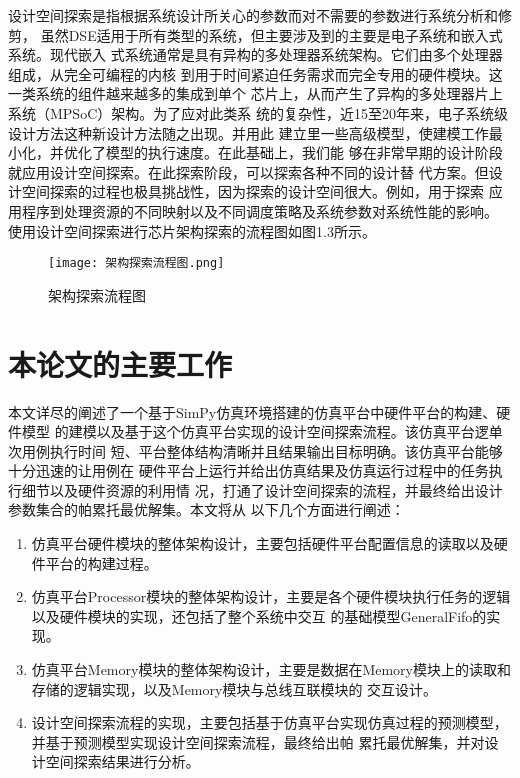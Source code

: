 设计空间探索是指根据系统设计所关心的参数而对不需要的参数进行系统分析和修剪\cite{13}，
虽然DSE适用于所有类型的系统，但主要涉及到的主要是电子系统和嵌入式系统。现代嵌入
式系统通常是具有异构的多处理器系统架构。它们由多个处理器组成，从完全可编程的内核
到用于时间紧迫任务需求而完全专用的硬件模块。这一类系统的组件越来越多的集成到单个
芯片上，从而产生了异构的多处理器片上系统（MPSoC）架构\cite{14}。为了应对此类系
统的复杂性，近15至20年来，电子系统级设计方法这种新设计方法随之出现。并用此
建立里一些高级模型，使建模工作最小化，并优化了模型的执行速度。在此基础上，我们能
够在非常早期的设计阶段就应用设计空间探索。在此探索阶段，可以探索各种不同的设计替
代方案。但设计空间探索的过程也极具挑战性，因为探索的设计空间很大。例如，用于探索
应用程序到处理资源的不同映射\cite{15}以及不同调度策略及系统参数对系统性能的影响。
使用设计空间探索进行芯片架构探索的流程图如图1.3所示。

\begin{figure}
    \centering
    \texttt{[image: 架构探索流程图.png]}
    \caption{架构探索流程图}
    \label{fig:badge}
\end{figure}


\section{本论文的主要工作}
本文详尽的阐述了一个基于SimPy仿真环境搭建的仿真平台中硬件平台的构建、硬件模型
的建模以及基于这个仿真平台实现的设计空间探索流程。该仿真平台逻单次用例执行时间
短、平台整体结构清晰并且结果输出目标明确。该仿真平台能够十分迅速的让用例在
硬件平台上运行并给出仿真结果及仿真运行过程中的任务执行细节以及硬件资源的利用情
况，打通了设计空间探索的流程，并最终给出设计参数集合的帕累托最优解集。本文将从
以下几个方面进行阐述：

\begin{enumerate}
    \item 仿真平台硬件模块的整体架构设计，主要包括硬件平台配置信息的读取以及硬件平台的构建过程。
    \item 仿真平台Processor模块的整体架构设计，主要是各个硬件模块执行任务的逻辑以及硬件模块的实现，还包括了整个系统中交互
    的基础模型GeneralFifo的实现。
    \item 仿真平台Memory模块的整体架构设计，主要是数据在Memory模块上的读取和存储的逻辑实现，以及Memory模块与总线互联模块的
    交互设计。
    \item 设计空间探索流程的实现，主要包括基于仿真平台实现仿真过程的预测模型，并基于预测模型实现设计空间探索流程，最终给出帕
    累托最优解集，并对设计空间探索结果进行分析。
\end{enumerate}

